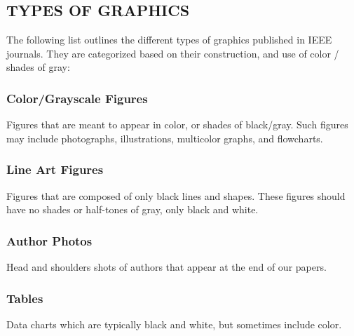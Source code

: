 \documentclass{ieeeojpel}
\begin{document}
\subsection{TYPES OF GRAPHICS}
The following list outlines the different types of graphics published in 
IEEE journals. They are categorized based on their construction, and use of 
color / shades of gray:

\subsubsection{Color/Grayscale Figures}
Figures that are meant to appear in color, or shades of black/gray. Such 
figures may include photographs, illustrations, multicolor graphs, and 
flowcharts.

\subsubsection{Line Art Figures}
Figures that are composed of only black lines and shapes. These figures 
should have no shades or half-tones of gray, only black and white.

\subsubsection{Author Photos}
Head and shoulders shots of authors that appear at the end of our papers. 

\subsubsection{Tables}
Data charts which are typically black and white, but sometimes include 
color.
\end{document}
